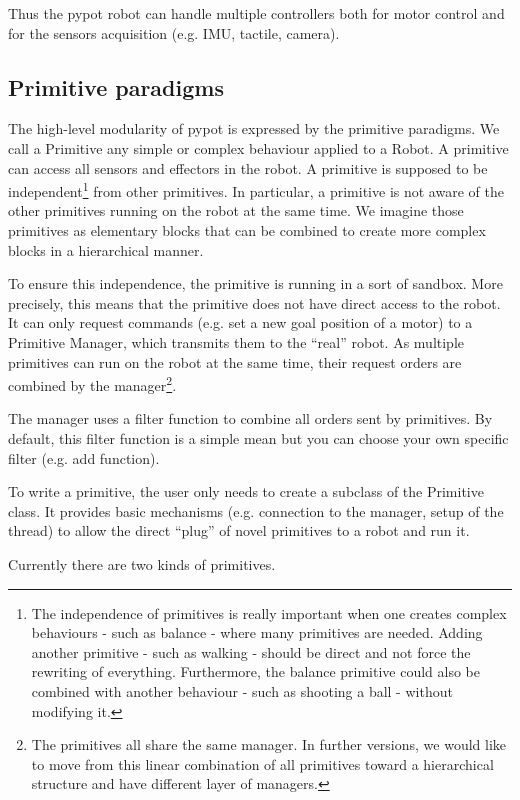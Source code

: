 Thus the pypot robot can handle multiple controllers both for motor control and for the sensors acquisition (e.g. IMU, tactile, camera).


\subsection{Primitive paradigms} %
\label{sub:primitive-paradigms}

The high-level modularity of pypot is expressed by the primitive paradigms. We call a Primitive any simple or complex behaviour applied to a Robot. A primitive can access all sensors and effectors in the robot. A primitive is supposed to be independent\footnote{The independence of primitives is really important when one creates complex behaviours - such as balance - where many primitives are needed. Adding another primitive - such as walking - should be direct and not force the rewriting of everything. Furthermore, the balance primitive could also be combined with another behaviour - such as shooting a ball - without modifying it.} from other primitives. In particular, a primitive is not aware of the other primitives running on the robot at the same time. We imagine those primitives as elementary blocks that can be combined to create more complex blocks in a hierarchical manner.

To ensure this independence, the primitive is running in a sort of sandbox. More precisely, this means that the primitive does not have direct access to the robot. It can only request commands (e.g. set a new goal position of a motor) to a Primitive Manager, which transmits them to the “real” robot. As multiple primitives can run on the robot at the same time, their request orders are combined by the manager\footnote{The primitives all share the same manager. In further versions, we would like to move from this linear combination of all primitives toward a hierarchical structure and have different layer of managers.}.

The manager uses a filter function to combine all orders sent by primitives. By default, this filter function is a simple mean but you can choose your own specific filter (e.g. add function).

To write a primitive, the user only needs to create a subclass of the Primitive class. It provides basic mechanisms (e.g. connection to the manager, setup of the thread) to allow the direct “plug” of novel primitives to a robot and run it.

Currently there are two kinds of primitives.


